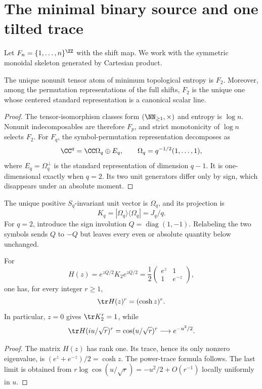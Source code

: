 \section{The minimal binary source and one tilted trace}
\label{sec:binary}

Let $F_n=\{1,\ldots,n\}^{\ZZ}$ with the shift map. We work with the symmetric
monoidal skeleton generated by Cartesian product.

\begin{proposition}
\label{prop:binary-selection}
The unique nonunit tensor atom of minimum topological entropy is $F_2$.
Moreover, among the permutation representations of the full shifts, $F_2$ is
the unique one whose centered standard representation is a canonical scalar
line.
\end{proposition}

\begin{proof}
The tensor-isomorphism classes form $(\NN_{\ge1},\times)$ and entropy is
$\log n$. Nonunit indecomposables are therefore $F_p$, and strict
monotonicity of $\log n$ selects $F_2$. For $F_q$, the symbol-permutation
representation decomposes as
\[
 \CC^q=\CC\Omega_q\oplus E_q,
 \qquad \Omega_q=q^{-1/2}(1,\ldots,1),
\]
where $E_q=\Omega_q^\perp$ is the standard representation of dimension
$q-1$. It is one-dimensional exactly when $q=2$. Its two unit generators
differ only by sign, which disappears under an absolute moment.
\end{proof}

The unique positive $S_q$-invariant unit vector is $\Omega_q$, and its
projection is
\[
 K_q=|\Omega_q\rangle\langle\Omega_q|=J_q/q.
\]
For $q=2$, introduce the sign involution $Q=\operatorname{diag}(1,-1)$.
Relabeling the two symbols sends $Q$ to $-Q$ but leaves every even or absolute
quantity below unchanged.

\begin{theorem}
\label{thm:tilted-trace}
For
\[
 H(z)=e^{zQ/2}K_2e^{zQ/2}
 =\frac12\begin{pmatrix}e^z&1\\1&e^{-z}\end{pmatrix},
\]
one has, for every integer $r\ge1$,
\[
 \tr H(z)^r=(\cosh z)^r.
\]
In particular, $z=0$ gives $\tr K_2^r=1$, while
\[
 \tr H(iu/\sqrt r)^r
 =\cos(u/\sqrt r)^r\longrightarrow e^{-u^2/2}.
\]
\end{theorem}

\begin{proof}
The matrix $H(z)$ has rank one. Its trace, hence its only nonzero eigenvalue,
is $(e^z+e^{-z})/2=\cosh z$. The power-trace formula follows. The last limit
is obtained from
$r\log\cos(u/\sqrt r)=-u^2/2+O(r^{-1})$ locally uniformly in $u$.
\end{proof}

